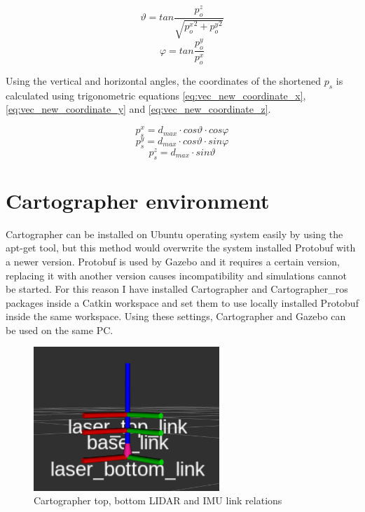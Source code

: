 \begin{equation} \label{eq:vec_elevation}
    \vartheta=tan\frac{p_{o}^{z}}{\sqrt{{p_{o}^{x}}^{2} + {p_{o}^{y}}^{2}}}
\end{equation}
\begin{equation} \label{eq:vec_horizontal}
    \varphi=tan\frac{p_{o}^{y}}{p_{o}^{x}}
\end{equation}

Using the vertical and horizontal angles, the coordinates of the shortened $p_{s}$ is calculated using 
trigonometric equations \ref{eq:vec_new_coordinate_x}, \ref{eq:vec_new_coordinate_y} 
and \ref{eq:vec_new_coordinate_z}.

\begin{equation} \label{eq:vec_new_coordinate_x}
    p_{s}^{x} = d_{max} \cdot cos\vartheta \cdot cos\varphi
\end{equation}
\begin{equation} \label{eq:vec_new_coordinate_y}
    p_{s}^{y} = d_{max} \cdot cos\vartheta \cdot sin\varphi
\end{equation}
\begin{equation} \label{eq:vec_new_coordinate_z}
    p_{s}^{z} = d_{max} \cdot  sin\vartheta
\end{equation}



\section{Cartographer environment} \label{sect:cartographer_environment}
Cartographer can be installed on Ubuntu operating system easily by using the apt-get tool, but this
method would overwrite the system installed Protobuf with a newer version. Protobuf is used by 
Gazebo and it requires a certain version, replacing it with another version causes incompatibility 
and simulations cannot be started. For this reason I have installed Cartographer and Cartographer\_ros
packages inside a Catkin workspace and set them to use locally installed Protobuf inside the same
workspace. Using these settings, Cartographer and Gazebo can be used on the same PC.

\begin{figure}[!ht]
    \centering
    \includegraphics[width=70mm, keepaspectratio]{figures/cartographer_tf_setup.png}
    \caption{Cartographer top, bottom LIDAR and IMU link relations}
    \label{fig:cartographer_tf_setup}
\end{figure}


